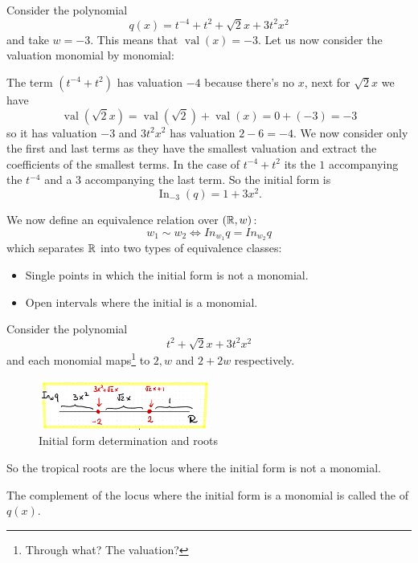 \documentclass[12pt]{memoir}
\DeclareMathOperator{\val}{val}
\theoremstyle{definition}
\begin{document}
\begin{Ex}
    Consider the polynomial 
    $$q(x)=t^{-4}+t^{2}+\sqrt{2}x+3t^2x^2$$
    and take $w=-3$. This means that $\val(x)=-3$. Let us now consider the valuation monomial by monomial:\par 
    The term $(t^{-4}+t^{2})$ has valuation $-4$ because there's no $x$, next for $\sqrt{2}x$ we have
    $$\val(\sqrt{2}x)=\val(\sqrt{2})+\val(x)=0+(-3)=-3$$
    so it has valuation $-3$ and $3t^2x^2$ has valuation $2-6=-4$. We now consider only the first and last terms as they have the smallest valuation and extract the coefficients of the smallest terms. In the case of $t^{-4}+t^{2}$ its the $1$ accompanying the $t^{-4}$ and a $3$ accompanying the last term. So the initial form is 
    $$\operatorname{In}_{-3}(q)=1+3x^2.$$
\end{Ex}

\par 
We now define an equivalence relation over $(\mathbb{R},w)$: 
$$w_1\sim w_2\iff In_{w_1}q=In_{w_2}q$$ 
which separates $\mathbb{R}$ into two types of equivalence classes:
\begin{itemize}
    \item Single points in which the initial form is not a monomial.
    \item Open intervals where the initial is a monomial.
\end{itemize}

\begin{Ex}
    Consider the polynomial 
    $$t^2+\sqrt2x+3t^2x^2$$
    and each monomial maps\footnote{Through what? The valuation?} to $2,w$ and $2+2w$ respectively.
    \begin{figure}[h!]
        \centering
        \includegraphics[width=0.5\textwidth]{figs/fig6-3-InitialFormExample.png}
        \caption{Initial form determination and roots}
        \label{fig:6.3-InitialFormExample}
    \end{figure}
    So the tropical roots are the locus where the initial form is not a monomial.
\end{Ex}

\begin{Def}
    The complement of the locus where the initial form is a monomial is called the  of $q(x)$.
\end{Def}
\end{document}
